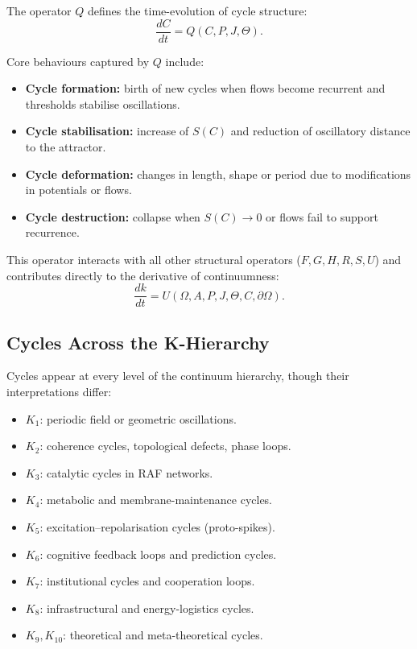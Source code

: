 The operator \(Q\) defines the time-evolution of cycle structure:
\[
  \frac{dC}{dt} = Q(C,P,J,\Theta).
\]

Core behaviours captured by \(Q\) include:
\begin{itemize}
  \item \textbf{Cycle formation:} birth of new cycles when flows become
        recurrent and thresholds stabilise oscillations.
  \item \textbf{Cycle stabilisation:} increase of \(S(C)\) and reduction of
        oscillatory distance to the attractor.
  \item \textbf{Cycle deformation:} changes in length, shape or period due to
        modifications in potentials or flows.
  \item \textbf{Cycle destruction:} collapse when
        \(S(C)\to 0\) or flows fail to support recurrence.
\end{itemize}

This operator interacts with all other structural operators
(\(F,G,H,R,S,U\)) and contributes directly to the derivative of
continuumness:
\[
  \frac{dk}{dt} = U(\Omega,A,P,J,\Theta,C,\partial\Omega).
\]

\subsection{Cycles Across the K-Hierarchy}

Cycles appear at every level of the continuum hierarchy, though
their interpretations differ:

\begin{itemize}
  \item \(K_1\): periodic field or geometric oscillations.
  \item \(K_2\): coherence cycles, topological defects, phase loops.
  \item \(K_3\): catalytic cycles in RAF networks.
  \item \(K_4\): metabolic and membrane-maintenance cycles.
  \item \(K_5\): excitation–repolarisation cycles (proto-spikes).
  \item \(K_6\): cognitive feedback loops and prediction cycles.
  \item \(K_7\): institutional cycles and cooperation loops.
  \item \(K_8\): infrastructural and energy-logistics cycles.
  \item \(K_9,K_{10}\): theoretical and meta-theoretical cycles.
\end{itemize}

